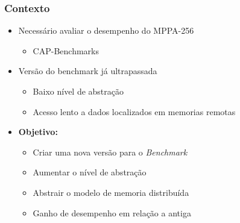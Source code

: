 \documentclass[xcolor={table}]{beamer}
\begin{document}
\begin{frame}\frametitle{Contexto}
    \begin{itemize}
        \item {Necessário avaliar o desempenho do MPPA-256}
        \begin{itemize}
            \item CAP-Benchmarks
        \end{itemize}
        \item {Versão do benchmark já ultrapassada}
        \begin{itemize}
            \item Baixo nível de abstração
            \item Acesso lento a dados localizados em memorias remotas
        \end{itemize}
        \item {\textbf{Objetivo:}}
        \begin{itemize}
        	\item Criar uma nova versão para o \textit{Benchmark}
            \item Aumentar o nível de abstração
            \item Abstrair o modelo de memoria distribuída
            \item Ganho de desempenho em relação a antiga
        \end{itemize}
    \end{itemize}
    \vfill
\end{frame}
\end{document}
